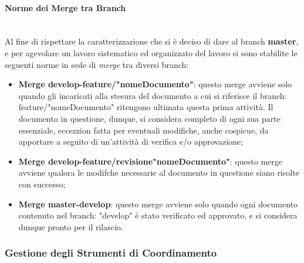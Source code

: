 \paragraph{Norme dei Merge tra Branch} ~\\
	Al fine di rispettare la caratterizzazione che si è deciso di dare al branch \textbf{master}, e per agevolare un lavoro sistematico ed organizzato del lavoro si sono stabilite le seguenti norme in sede di \textit{merge} tra diversi branch:
	\begin{itemize}
	\item \textbf{Merge develop-feature/"nomeDocumento"}: questo merge avviene solo quando gli incaricati alla stesura del documento a cui si riferisce il branch: feature/"nomeDocumento" ritengono ultimata questa prima attività. Il documento in questione, dunque, si considera completo di ogni sua parte essenziale, eccezzion fatta per eventuali modifiche, anche cospicue, da apportare a seguito di un'attività di verifica e/o approvazione;
	\item \textbf{Merge develop-feature/revisione"nomeDocumento"}: questo merge avviene qualora le modifche necessarie al documento in questione siano risolte con successo;
	\item \textbf{Merge master-develop}: questo merge avviene solo quando ogni documento contenuto nel branch: "develop" è stato verificato ed approvato, e si considera dunque pronto per il rilascio.
	\end{itemize}


\subsubsection{Gestione degli Strumenti di Coordinamento}


